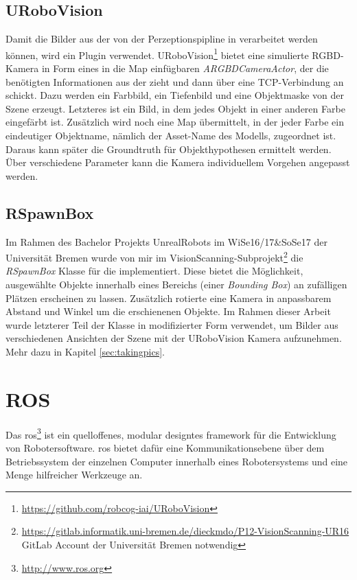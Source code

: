 \subsection{URoboVision}
\label{subsec:urobovision}
Damit die Bilder aus der \unreal von der Perzeptionspipline in \robosherlock verarbeitet werden können, wird ein \unreal Plugin verwendet. URoboVision\footnote{\url{https://github.com/robcog-iai/URoboVision}} bietet eine simulierte RGBD-Kamera in Form eines in die Map einfügbaren \textit{ARGBDCameraActor}, der die benötigten Informationen aus der \unreal zieht und dann über eine TCP-Verbindung an \robosherlock schickt. Dazu werden ein Farbbild, ein Tiefenbild und eine Objektmaske von der Szene erzeugt. Letzteres ist ein Bild, in dem jedes Objekt in einer anderen Farbe eingefärbt ist. Zusätzlich wird noch eine Map übermittelt, in der jeder Farbe ein eindeutiger Objektname, nämlich der Asset-Name des Modells, zugeordnet ist. Daraus kann später die Groundtruth für Objekthypothesen  ermittelt werden. Über verschiedene Parameter kann die Kamera individuellem Vorgehen angepasst werden. \par 

\subsection{RSpawnBox}
\label{sec:rspawnbox}

Im Rahmen des Bachelor Projekts UnrealRobots im WiSe16/17\&SoSe17 der Universität Bremen wurde von mir im VisionScanning-Subprojekt\footnote{\url{https://gitlab.informatik.uni-bremen.de/dieckmdo/P12-VisionScanning-UR16} GitLab Account der Universität Bremen notwendig} die \textit{RSpawnBox} Klasse für die \unreal implementiert. Diese bietet die Möglichkeit, ausgewählte Objekte innerhalb eines Bereichs (einer \textit{Bounding Box}) an zufälligen Plätzen erscheinen zu lassen. Zusätzlich rotierte eine Kamera in anpassbarem Abstand und Winkel um die erschienenen Objekte. Im Rahmen dieser Arbeit wurde letzterer Teil der Klasse in modifizierter Form verwendet, um Bilder aus verschiedenen Ansichten der Szene mit der URoboVision Kamera aufzunehmen. Mehr dazu in Kapitel \ref{sec:takingpics}.         

\section{ROS}
\label{sec:ros}
Das \gls{ros}\footnote{\url{http://www.ros.org}} ist ein quelloffenes, modular designtes \gls{framework} für die Entwicklung von Robotersoftware. \gls{ros} bietet dafür eine Kommunikationsebene über dem Betriebssystem der einzelnen Computer innerhalb eines Robotersystems und eine Menge hilfreicher Werkzeuge an. \cite{ros}\par 


